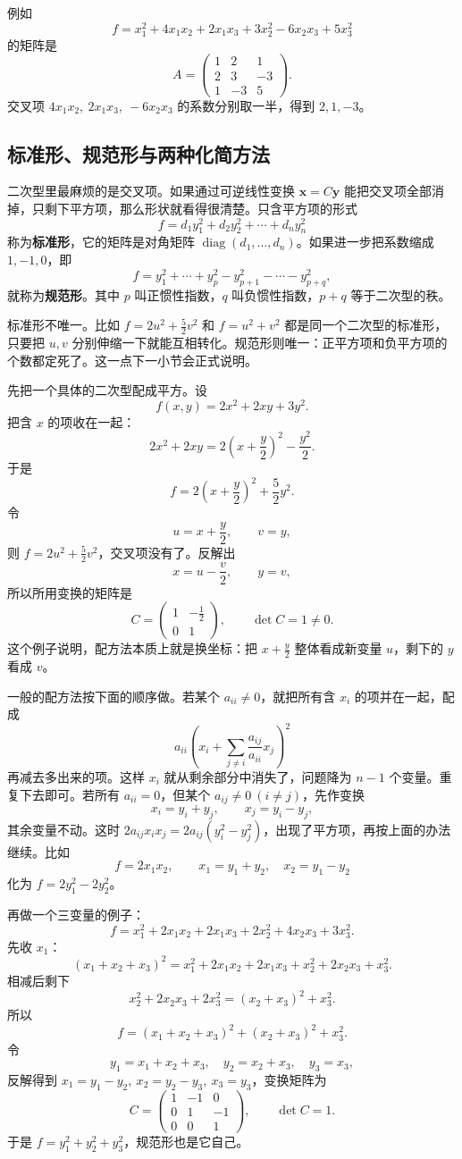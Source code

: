 例如
\[
f=x_1^2+4x_1x_2+2x_1x_3+3x_2^2-6x_2x_3+5x_3^2
\]
的矩阵是
\[
A=\begin{pmatrix}
1&2&1\\
2&3&-3\\
1&-3&5
\end{pmatrix}.
\]
交叉项 $4x_1x_2,\ 2x_1x_3,\ -6x_2x_3$ 的系数分别取一半，得到 $2,1,-3$。

\subsection{标准形、规范形与两种化简方法}

二次型里最麻烦的是交叉项。如果通过可逆线性变换 $\mathbf{x}=C\mathbf{y}$ 能把交叉项全部消掉，只剩下平方项，那么形状就看得很清楚。只含平方项的形式
\[
f=d_1y_1^2+d_2y_2^2+\cdots+d_ny_n^2
\]
称为\textbf{标准形}，它的矩阵是对角矩阵 $\operatorname{diag}(d_1,\dots,d_n)$。如果进一步把系数缩成 $1,-1,0$，即
\[
f=y_1^2+\cdots+y_p^2-y_{p+1}^2-\cdots-y_{p+q}^2,
\]
就称为\textbf{规范形}。其中 $p$ 叫正惯性指数，$q$ 叫负惯性指数，$p+q$ 等于二次型的秩。

标准形不唯一。比如 $f=2u^2+\frac52v^2$ 和 $f=u^2+v^2$ 都是同一个二次型的标准形，只要把 $u,v$ 分别伸缩一下就能互相转化。规范形则唯一：正平方项和负平方项的个数都定死了。这一点下一小节会正式说明。

先把一个具体的二次型配成平方。设
\[
f(x,y)=2x^2+2xy+3y^2.
\]
把含 $x$ 的项收在一起：
\[
2x^2+2xy=2\left(x+\frac y2\right)^2-\frac{y^2}{2}.
\]
于是
\[
f=2\left(x+\frac y2\right)^2+\frac52y^2.
\]
令
\[
u=x+\frac y2,\qquad v=y,
\]
则 $f=2u^2+\frac52v^2$，交叉项没有了。反解出
\[
x=u-\frac v2,\qquad y=v,
\]
所以所用变换的矩阵是
\[
C=\begin{pmatrix}1&-\frac12\\[2pt]0&1\end{pmatrix},\qquad \det C=1\ne0.
\]
这个例子说明，配方法本质上就是换坐标：把 $x+\frac y2$ 整体看成新变量 $u$，剩下的 $y$ 看成 $v$。

一般的配方法按下面的顺序做。若某个 $a_{ii}\ne0$，就把所有含 $x_i$ 的项并在一起，配成
\[
a_{ii}\left(x_i+\sum_{j\ne i}\frac{a_{ij}}{a_{ii}}x_j\right)^2
\]
再减去多出来的项。这样 $x_i$ 就从剩余部分中消失了，问题降为 $n-1$ 个变量。重复下去即可。若所有 $a_{ii}=0$，但某个 $a_{ij}\ne0\ (i\ne j)$，先作变换
\[
x_i=y_i+y_j,\qquad x_j=y_i-y_j,
\]
其余变量不动。这时 $2a_{ij}x_ix_j=2a_{ij}(y_i^2-y_j^2)$，出现了平方项，再按上面的办法继续。比如
\[
f=2x_1x_2,\qquad x_1=y_1+y_2,\quad x_2=y_1-y_2
\]
化为 $f=2y_1^2-2y_2^2$。

再做一个三变量的例子：
\[
f=x_1^2+2x_1x_2+2x_1x_3+2x_2^2+4x_2x_3+3x_3^2.
\]
先收 $x_1$：
\[
(x_1+x_2+x_3)^2=x_1^2+2x_1x_2+2x_1x_3+x_2^2+2x_2x_3+x_3^2.
\]
相减后剩下
\[
x_2^2+2x_2x_3+2x_3^2=(x_2+x_3)^2+x_3^2.
\]
所以
\[
f=(x_1+x_2+x_3)^2+(x_2+x_3)^2+x_3^2.
\]
令
\[
y_1=x_1+x_2+x_3,\quad y_2=x_2+x_3,\quad y_3=x_3,
\]
反解得到 $x_1=y_1-y_2,\ x_2=y_2-y_3,\ x_3=y_3$，变换矩阵为
\[
C=\begin{pmatrix}
1&-1&0\\
0&1&-1\\
0&0&1
\end{pmatrix},\qquad \det C=1.
\]
于是 $f=y_1^2+y_2^2+y_3^2$，规范形也是它自己。

